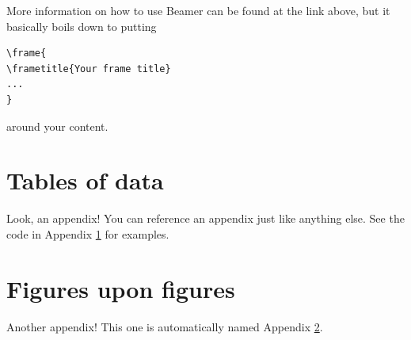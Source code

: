 \documentclass[12pt]{article}
\begin{document}
More information on how to use Beamer can be found at the link above, but it basically boils down to putting 
\begin{verbatim}
\frame{
\frametitle{Your frame title}
...
}
\end{verbatim}
around your content.





%
%


\newpage

\appendix

\section{Tables of data} \label{app:tabledata}
Look, an appendix! You can reference an appendix just like anything else. See the code in Appendix \ref{app:tabledata} for examples.

\newpage

\section{Figures upon figures} \label{app:figs}
Another appendix! This one is automatically named Appendix \ref{app:figs}.
\end{document}
